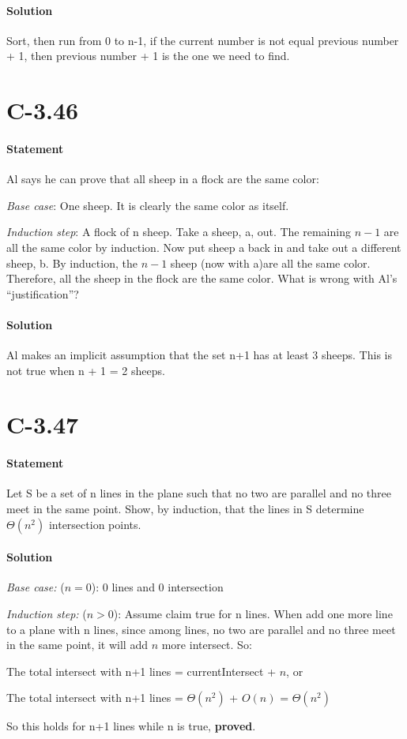 \documentclass{article}
\begin{document}
  \paragraph{Solution}
  Sort, then run from 0 to n-1, if the current number is not equal previous number + 1, then previous number + 1 is the one we need to find.
\newpage \setlength{\parindent}{14ex}\section{C-3.46}
  \paragraph{Statement}
   Al says he can prove that all sheep in a flock are the same color:\par \textit{Base case}: One sheep. It is clearly the same color as itself.\par \textit{Induction step}: A flock of n sheep. Take a sheep, a, out. The remaining $n - 1$ are all the same color by induction. Now put sheep a back in and take out a different sheep, b. By induction, the $n - 1$ sheep (now with a)are all the same color. Therefore, all the sheep in the flock are the same color. What is wrong with Al’s “justification”?
  \paragraph{Solution}
  Al makes an implicit assumption that the set n+1 has at least 3 sheeps. This is not true when n + 1 = 2 sheeps.
\section{C-3.47}
  \paragraph{Statement}
  Let S be a set of n lines in the plane such that no two are parallel and no three meet in the same point. Show, by induction, that the lines in S determine $\Theta(n^2)$ intersection points.
  \paragraph{Solution}
  \par \textit{Base case:} ($n = 0$): 0 lines and 0 intersection
  \par \textit{Induction step:}  ($n > 0$): Assume claim true for n lines. When add one more line to a plane with n lines, since among lines, no two are parallel and no three meet in the same point, it will add $n$ more intersect. So:\par The total intersect with n+1 lines = currentIntersect + $n$, or
  \par The total intersect with n+1 lines = $\Theta(n^2)$ + $O(n)$ = $\Theta(n^2)$
  \par So this holds for n+1 lines while n is true, \textbf{proved}.
\end{document}
